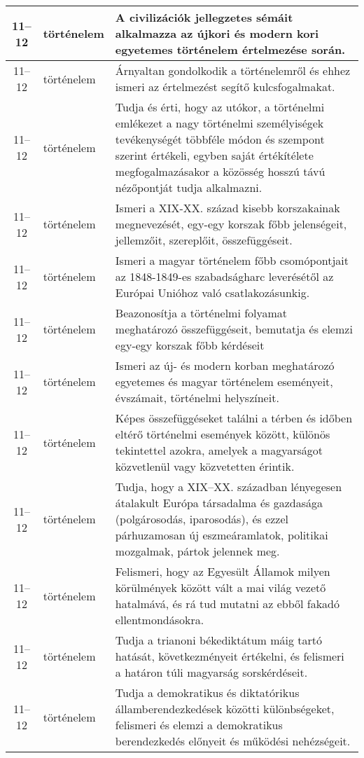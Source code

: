 \begin{small}
\begin{longtable}{c | p{2cm} |  p{11cm} }
              11--12 & történelem & A civilizációk jellegzetes sémáit alkalmazza az újkori és modern kori egyetemes történelem értelmezése során. \\ \hline
              11--12 & történelem & Árnyaltan gondolkodik a történelemről és ehhez ismeri az értelmezést segítő kulcsfogalmakat. \\ \hline
              11--12 & történelem & Tudja és érti, hogy az utókor, a történelmi emlékezet a nagy történelmi személyiségek tevékenységét többféle módon és szempont szerint értékeli, egyben saját értékítélete megfogalmazásakor a közösség hosszú távú nézőpontját tudja alkalmazni. \\ \hline
              11--12 & történelem & Ismeri a XIX-XX. század kisebb korszakainak megnevezését, egy-egy korszak főbb jelenségeit, jellemzőit, szereplőit, összefüggéseit. \\ \hline
              11--12 & történelem & Ismeri a magyar történelem főbb csomópontjait az 1848-1849-es szabadságharc leverésétől az Európai Unióhoz való csatlakozásunkig. \\ \hline
              11--12 & történelem & Beazonosítja a történelmi folyamat meghatározó összefüggéseit, bemutatja és elemzi egy-egy korszak főbb kérdéseit \\ \hline
              11--12 & történelem & Ismeri az új- és modern korban meghatározó egyetemes és magyar történelem eseményeit, évszámait, történelmi helyszíneit. \\ \hline
              11--12 & történelem & Képes összefüggéseket találni a térben és időben eltérő történelmi események között, különös tekintettel azokra, amelyek a magyarságot közvetlenül vagy közvetetten érintik. \\ \hline
              11--12 & történelem & Tudja, hogy a XIX–XX. században lényegesen átalakult Európa társadalma és gazdasága (polgárosodás, iparosodás), és ezzel párhuzamosan új eszmeáramlatok, politikai mozgalmak, pártok jelennek meg. \\ \hline
              11--12 & történelem & Felismeri, hogy az Egyesült Államok milyen körülmények között vált a mai világ vezető hatalmává, és rá tud mutatni az ebből fakadó ellentmondásokra. \\ \hline
              11--12 & történelem & Tudja a trianoni békediktátum máig tartó hatását, következményeit értékelni, és felismeri a határon túli magyarság sorskérdéseit. \\ \hline
              11--12 & történelem & Tudja a demokratikus és diktatórikus államberendezkedések közötti különbségeket, felismeri és elemzi a demokratikus berendezkedés előnyeit és működési nehézségeit. \\ \hline

\end{longtable}
\end{small}
